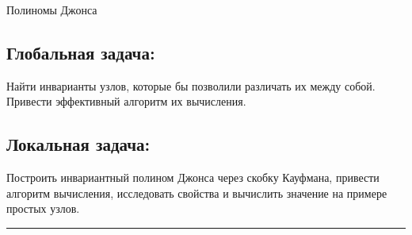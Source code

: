 \documentclass[a4paper,8pt]{extarticle}
\begin{document}
\begin{center}
    \Huge Полиномы Джонса
\end{center}
\begin{multicols}{2}
\subsection*{Глобальная задача:}
Найти инварианты узлов, которые бы позволили различать их между собой. Привести эффективный алгоритм их вычисления.

\columnbreak
\subsection*{Локальная задача:}
Построить инвариантный полином Джонса через скобку Кауфмана, привести алгоритм вычисления, исследовать свойства и вычислить значение на примере простых узлов.
\end{multicols}

\hrule
\end{document}
